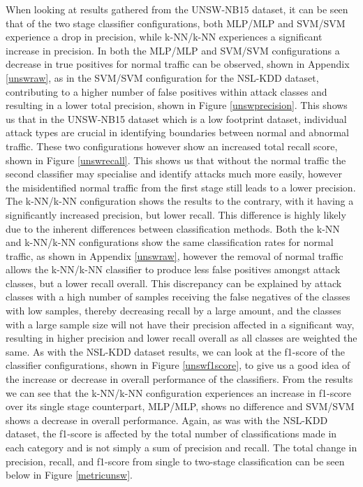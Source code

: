 \documentclass[12pt,a4paper]{article}
\begin{document}
When looking at results gathered from the UNSW-NB15 dataset, it can be seen that of the two stage classifier configurations, both MLP/MLP and SVM/SVM experience a drop in precision, while k-NN/k-NN experiences a significant increase in precision. In both the MLP/MLP and SVM/SVM configurations a decrease in true positives for normal traffic can be observed, shown in Appendix \ref{unswraw}, as in the SVM/SVM configuration for the NSL-KDD dataset, contributing to a higher number of false positives within attack classes and resulting in a lower total precision, shown in Figure \ref{unswprecision}. This shows us that in the UNSW-NB15 dataset which is a low footprint dataset, individual attack types are crucial in identifying boundaries between normal and abnormal traffic. These two configurations however show an increased total recall score, shown in Figure \ref{unswrecall}. This shows us that without the normal traffic the second classifier may specialise and identify attacks much more easily, however the misidentified normal traffic from the first stage still leads to a lower precision. The k-NN/k-NN configuration shows the results to the contrary, with it having a significantly increased precision, but lower recall. This difference is highly likely due to the inherent differences between classification methods. Both the k-NN and k-NN/k-NN configurations show the same classification rates for normal traffic, as shown in Appendix \ref{unswraw}, however the removal of normal traffic allows the k-NN/k-NN classifier to produce less false positives amongst attack classes, but a lower recall overall. This discrepancy can be explained by attack classes with a high number of samples receiving the false negatives of the classes with low samples, thereby decreasing recall by a large amount, and the classes with a large sample size will not have their precision affected in a significant way, resulting in higher precision and lower recall overall as all classes are weighted the same. As with the NSL-KDD dataset results, we can look at the f1-score of the classifier configurations, shown in Figure \ref{unswf1score}, to give us a good idea of the increase or decrease in overall performance of the classifiers. From the results we can see that the k-NN/k-NN configuration experiences an increase in f1-score over its single stage counterpart, MLP/MLP, shows no difference and SVM/SVM shows a decrease in overall performance. Again, as was with the NSL-KDD dataset, the f1-score is affected by the total number of classifications made in each category and is not simply a sum of precision and recall. The total change in precision, recall, and f1-score from single to two-stage classification can be seen below in Figure \ref{metricunsw}.
\end{document}
